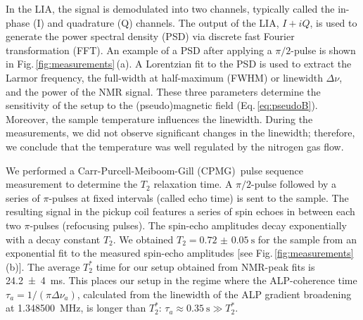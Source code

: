 \documentclass[superscriptaddress,
floatfix,
reprint,
nofootinbib,
amsmath,amssymb,
aps,
prd,
]{revtex4-2}
\begin{document}
In the LIA, the signal is demodulated into two channels, typically called the in-phase (I) and quadrature (Q) channels.
The output of the LIA, $I + i Q$, is used to generate the power spectral density (PSD) via discrete fast Fourier transformation (FFT).
An example of a PSD after applying a $\pi/2$-pulse is shown in Fig.\,\ref{fig:measurements}\,(a).
A Lorentzian fit to the PSD is used to extract the Larmor frequency, the full-width at half-maximum (FWHM) or linewidth $\Delta\nu$, and the power of the NMR signal.
These three parameters determine the sensitivity of the setup to the (pseudo)magnetic field (Eq.\,\ref{eq:pseudoB}).
Moreover, the sample temperature influences the linewidth. 
During the measurements, we did not observe significant changes in the linewidth; therefore, we conclude that the temperature was well regulated by the nitrogen gas flow.

We performed a Carr-Purcell-Meiboom-Gill (CPMG)\,\cite{CPMG} pulse sequence measurement to determine the $T_2$ relaxation time. A $\pi/2$-pulse followed by a series of $\pi$-pulses at fixed intervals (called echo time) is sent to the sample.
The resulting signal in the pickup coil features a series of spin echoes in between each two $\pi$-pulses (refocusing pulses). 
The spin-echo amplitudes decay exponentially with a decay constant $T_2$. 
We obtained $T_2=\SI{0.72(5)}{\s}$ for the sample from an exponential fit to the measured spin-echo amplitudes [see Fig.\,\ref{fig:measurements}\,(b)]. 
The average $T_2^*$ time for our setup obtained from NMR-peak fits is \SI{24.2 \pm 4}{\ms}. This places our setup in the regime where the ALP-coherence time $\tau_a=1/( \pi \Delta \nu_a )$, calculated from the linewidth of the ALP gradient broadening\,\cite{Gramolin2022Feb_SpectralSignatures} at \SI{1.348500}{\MHz}, is longer than $T_2^*$: $\tau_a \approx \SI{0.35}{\s}\gg T_2^*$.
\end{document}
